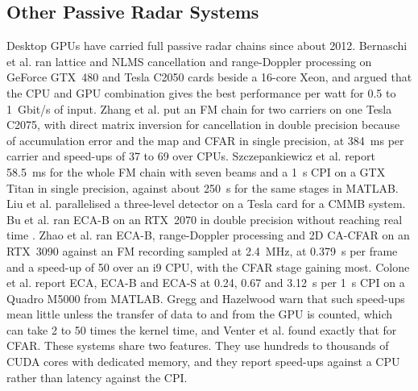 \subsection{Other Passive Radar Systems}
\label{subsec:ch2.implementations.other}
Desktop GPUs have carried full passive radar chains since about 2012. Bernaschi et al. \citep{bernaschi2012} ran lattice and NLMS cancellation and range-Doppler processing on GeForce GTX~480 and Tesla C2050 cards beside a 16-core Xeon, and argued that the CPU and GPU combination gives the best performance per watt for 0.5 to 1~Gbit/s of input. Zhang et al. \citep{zhang2014} put an FM chain for two carriers on one Tesla C2075, with direct matrix inversion for cancellation in double precision because of accumulation error and the map and CFAR in single precision, at 384~ms per carrier and speed-ups of 37 to 69 over CPUs. Szczepankiewicz et al. \citep{szczepankiewicz2015} report 58.5~ms for the whole FM chain with seven beams and a 1~s CPI on a GTX Titan in single precision, against about 250~s for the same stages in MATLAB. Liu et al. \citep{liu2016} parallelised a three-level detector on a Tesla card for a CMMB system. Bu et al. \citep{bu2020} ran ECA-B on an RTX~2070 in double precision without reaching real time . Zhao et al. \citep{zhao2023} ran ECA-B, range-Doppler processing and 2D CA-CFAR on an RTX~3090 against an FM recording sampled at 2.4~MHz, at 0.379~s per frame and a speed-up of 50 over an i9 CPU, with the CFAR stage gaining most. Colone et al. \citep{colone2016} report ECA, ECA-B and ECA-S at 0.24, 0.67 and 3.12~s per 1~s CPI on a Quadro M5000 from MATLAB. Gregg and Hazelwood \citep{gregg2011} warn that such speed-ups mean little unless the transfer of data to and from the GPU is counted, which can take 2 to 50 times the kernel time, and Venter et al. \citep{venter2011} found exactly that for CFAR. These systems share two features. They use hundreds to thousands of CUDA cores with dedicated memory, and they report speed-ups against a CPU rather than latency against the CPI.

